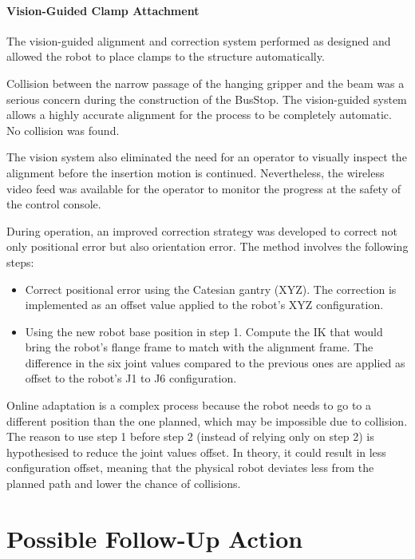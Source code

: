 \documentclass[11pt]{book}
\begin{document}
\paragraph{Vision-Guided Clamp Attachment}

The vision-guided alignment and correction system performed as designed and allowed the robot to place clamps to the structure automatically. 

Collision between the narrow passage of the hanging gripper and the beam was a serious concern during the construction of the BusStop. The vision-guided system allows a highly accurate alignment for the process to be completely automatic. No collision was found.

The vision system also eliminated the need for an operator to visually inspect the alignment before the insertion motion is continued. Nevertheless, the wireless video feed was available for the operator to monitor the progress at the safety of the control console.

During operation, an improved correction strategy was developed to correct not only positional error but also orientation error. The method involves the following steps:

\begin{itemize}
	\item Correct positional error using the Catesian gantry (XYZ). The correction is implemented as an offset value applied to the robot’s XYZ configuration.

	\item Using the new robot base position in step 1. Compute the IK that would bring the robot’s flange frame to match with the alignment frame. The difference in the six joint values compared to the previous ones are applied as offset to the robot’s J1 to J6 configuration.

\end{itemize}
Online adaptation is a complex process because the robot needs to go to a different position than the one planned, which may be impossible due to collision. The reason to use step 1 before step 2 (instead of relying only on step 2) is hypothesised to reduce the joint values offset. In theory, it could result in less configuration offset, meaning that the physical robot deviates less from the planned path and lower the chance of collisions. 

\section{Possible Follow-Up Action}
\end{document}
